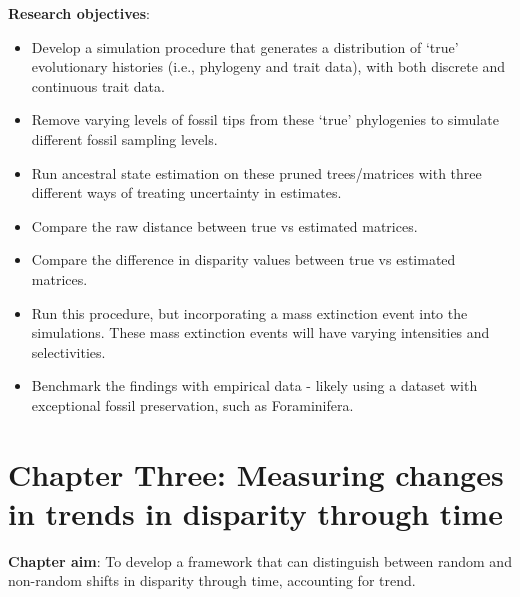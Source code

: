 \documentclass[titlepage]{article}
\begin{document}
\noindent\textbf{Research objectives}: 
\begin{itemize}
    \item Develop a simulation procedure that generates a distribution of `true' evolutionary histories (i.e., phylogeny and trait data), with both discrete and continuous trait data.
    \item Remove varying levels of fossil tips from these `true' phylogenies to simulate different fossil sampling levels.
    \item Run ancestral state estimation on these pruned trees/matrices with three different ways of treating uncertainty in estimates.
    \item Compare the raw distance between true vs estimated matrices.
    \item Compare the difference in disparity values between true vs estimated matrices.
    \item Run this procedure, but incorporating a mass extinction event into the simulations. These mass extinction events will have varying intensities and selectivities. 
    \item Benchmark the findings with empirical data - likely using a dataset with exceptional fossil preservation, such as Foraminifera.
\end{itemize} %


\section{Chapter Three: Measuring changes in trends in disparity through time}


\textbf{Chapter aim}: To develop a framework that can distinguish between random and non-random shifts in disparity through time, accounting for trend.
\end{document}
